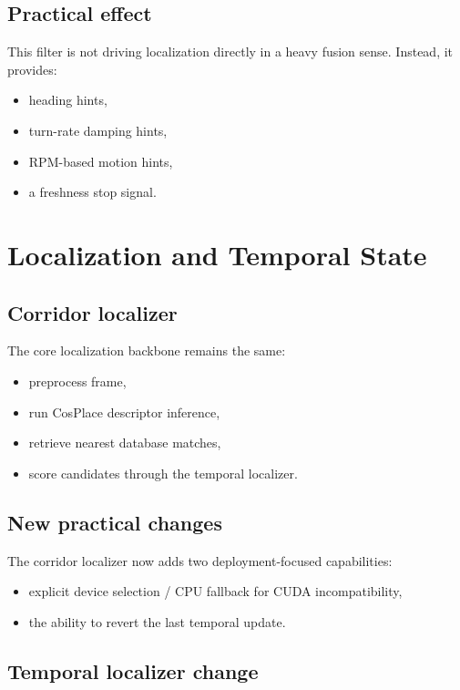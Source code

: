 \documentclass[11pt,a4paper]{article}
\begin{document}
\subsection{Practical effect}

This filter is not driving localization directly in a heavy fusion sense.
Instead, it provides:

\begin{itemize}[nosep]
  \item heading hints,
  \item turn-rate damping hints,
  \item RPM-based motion hints,
  \item a freshness stop signal.
\end{itemize}


\section{Localization and Temporal State}

\subsection{Corridor localizer}

The core localization backbone remains the same:

\begin{itemize}[nosep]
  \item preprocess frame,
  \item run CosPlace descriptor inference,
  \item retrieve nearest database matches,
  \item score candidates through the temporal localizer.
\end{itemize}

\subsection{New practical changes}

The corridor localizer now adds two deployment-focused capabilities:

\begin{itemize}[nosep]
  \item explicit device selection / CPU fallback for CUDA incompatibility,
  \item the ability to revert the last temporal update.
\end{itemize}

\subsection{Temporal localizer change}
\end{document}
